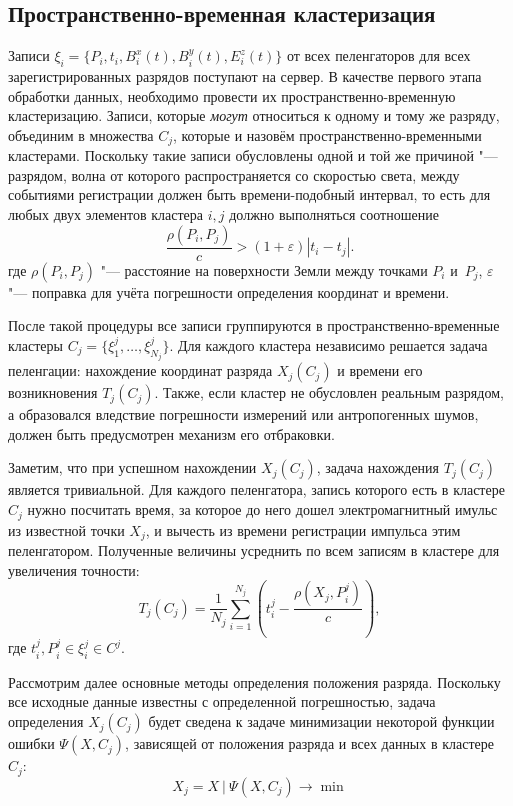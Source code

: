 \subsection{Пространственно-временная кластеризация}
\label{sec:space-time-cluster}
Записи $\xi_i = \{P_i, t_i, B^x_i(t), B^y_i(t), E^z_i(t)\}$ от всех пеленгаторов для всех зарегистрированных разрядов поступают на сервер. В качестве первого этапа обработки данных, необходимо провести их пространственно-временную кластеризацию. Записи, которые \textit{могут} относиться к одному и тому же разряду, объединим в множества $C_j$, которые и назовём пространственно-временными кластерами. Поскольку такие записи обусловлены одной и той же причиной "--- разрядом, волна от которого распространяется со скоростью света, между событиями регистрации должен быть времени-подобный интервал, то есть для любых двух элементов кластера $i, j$ должно выполняться соотношение
\begin{equation}
	\frac{\rho(P_i, P_j)}{c} > (1+\varepsilon) |t_i - t_j|.
\end{equation}
где $\rho(P_i, P_j)$ "--- расстояние на поверхности Земли между точками $P_i$ и~$P_j$, $\varepsilon$ "--- поправка для учёта погрешности определения координат и времени.

После такой процедуры все записи группируются в пространственно-временные кластеры $C_j = \{\xi^j_1, \ldots, \xi^j_{N_j}\}$. Для каждого кластера независимо решается задача пеленгации: нахождение координат разряда $X_j(C_j)$ и времени его возникновения $T_j(C_j)$. Также, если кластер не обусловлен реальным разрядом, а образовался вледствие погрешности измерений или антропогенных шумов, должен быть предусмотрен механизм его отбраковки.

Заметим, что при успешном нахождении $X_j(C_j)$, задача нахождения $T_j(C_j)$ является тривиальной. Для каждого пеленгатора, запись которого есть в кластере $C_j$ нужно посчитать время, за которое до него дошел электромагнитный имульс из известной точки $X_j$, и вычесть из времени регистрации импульса этим пеленгатором. Полученные величины усреднить по всем записям в кластере для увеличения точности:
\begin{equation}
	T_j(C_j) = \frac{1}{N_j} \sum_{i=1}^{N_j} \left( t^j_i - \frac{\rho(X_j, P^j_i)}{c} \right),
\end{equation}
где $t^j_i, P^j_i \in \xi_i^j \in C^j$.

Рассмотрим далее основные методы определения положения разряда. Поскольку все исходные данные известны с определенной погрешностью, задача определения $X_j(C_j)$ будет сведена к задаче минимизации некоторой функции ошибки $\Psi(X, C_j)$, зависящей от положения разряда и всех данных в кластере $C_j$:
\begin{equation}
	X_j = X~|~\Psi(X, C_j) \rightarrow \min
\end{equation}

